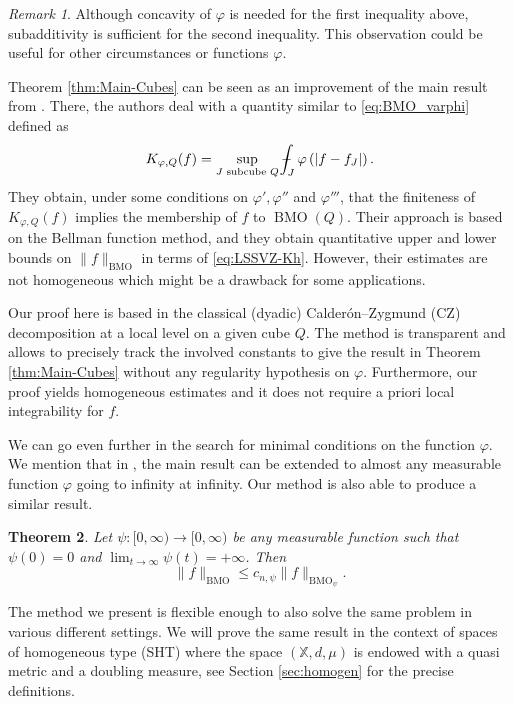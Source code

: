 \documentclass[11pt,a4paper]{amsart}
\newtheorem{theorem}{Theorem}[section]
\theoremstyle{definition}
\theoremstyle{remark}
\newtheorem{remark}[theorem]{Remark}
\numberwithin{equation}{section}
\DeclareMathOperator{\BMO}{BMO}
\def\Xint#1{\mathchoice
  {\XXint\displaystyle\textstyle{#1}}%
  {\XXint\textstyle\scriptstyle{#1}}%
  {\XXint\scriptstyle\scriptscriptstyle{#1}}%
  {\XXint\scriptscriptstyle\scriptscriptstyle{#1}}%
  \!\int}
\def\XXint#1#2#3{{\setbox0=\hbox{$#1{#2#3}{\int}$}
    \vcenter{\hbox{$#2#3$}}\kern-.5\wd0}}
\def\avgint{\Xint-}
\numberwithin{equation}{section}
\begin{document}
\begin{remark} 
Although concavity of $\varphi$ is needed for the first inequality above, subadditivity is sufficient for the second inequality. This  observation could be useful for other circumstances or functions $\varphi$.
\end{remark}
%

Theorem \ref{thm:Main-Cubes} can be seen as an improvement of the main result from \cite{LSSVZ-BMO}. There, the authors deal with a quantity similar to \eqref{eq:BMO_varphi} defined as 
%
\begin{equation}\label{eq:LSSVZ-Kh}
K_{\varphi, Q}(f)=\sup _{J \text { subcube } Q}
\avgint_J \varphi\left(\left|f-f_J\right|\right).
\end{equation}
%
They obtain, under some conditions on $\varphi',\varphi''$ and $\varphi'''$, that the finiteness of $K_{\varphi, Q}(f)$ implies the membership of $f$ to $\BMO(Q)$. Their approach is based on the Bellman function method,  and they obtain quantitative upper and lower bounds on $\|f\|_{\BMO}$ in terms of \eqref{eq:LSSVZ-Kh}. However, their estimates are not homogeneous which might be a drawback for some applications.

Our proof here is based in the classical (dyadic) Calder\'on--Zygmund (CZ) decomposition at a local level on a given cube $Q$. The method is transparent and allows to precisely track the involved constants to give the result in Theorem \ref{thm:Main-Cubes} without any regularity hypothesis on $\varphi$. Furthermore, our proof yields homogeneous estimates and it does not require a priori local integrability for $f$.


We can go even further in the search for minimal conditions on the function $\varphi$. We mention that in \cite{LSSVZ-BMO}, the main result can be extended to almost any measurable function $\varphi$ going to infinity at infinity. Our method is also able to produce a similar result. 

\begin{theorem}\label{thm:Main-Cubes-general-phi}
Let $\psi:[0,\infty)\to[0,\infty)$ be any measurable function such that $\psi(0)=0$ and $\lim_{t\to \infty}\psi(t)=+\infty$. Then 
%
\begin{equation}\label{estimateGeneral-phi}
 \|f\|_{\BMO} \leq c_{n,\psi} \|f\|_{\BMO_\psi}.
\end{equation}
%
\end{theorem}



The method we present is flexible enough to also  solve the same problem in various different settings. We will prove the same result in the context of spaces of homogeneous type (SHT) where the space $(\mathbb X,d,\mu)$ is endowed with a quasi metric and a doubling measure, see Section \ref{sec:homogen} for the precise definitions.
\end{document}
